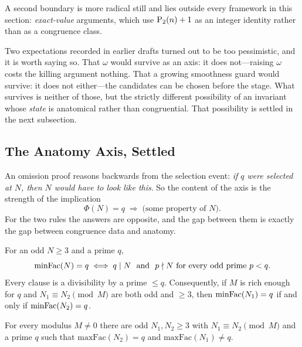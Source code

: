 \noindent
A second boundary is more radical still and lies outside every framework
in this section: \emph{exact-value} arguments, which use
$\mathrm{P}_{2}(n)+1$ as an integer identity rather than as a congruence
class.

\smallskip\noindent
Two expectations recorded in earlier drafts turned out to be too
pessimistic, and it is worth saying so.  That $\omega$ would survive as
an axis: it does not---raising $\omega$ costs the killing argument
nothing.  That a growing smoothness guard would survive: it does not
either---the candidates can be chosen before the stage.  What survives
is neither of those, but the strictly different possibility of an
invariant whose \emph{state} is anatomical rather than congruential.
That possibility is settled in the next subsection.

\subsection{The Anatomy Axis, Settled}
\label{sec:anatomy-axis}

An omission proof reasons backwards from the selection event: \emph{if
$q$ were selected at $N$, then $N$ would have to look like this}.  So the
content of the axis is the strength of the implication
\[
  \Phi(N) = q \;\Longrightarrow\; \text{(some property of } N\text{)}.
\]
For the two rules the answers are opposite, and the gap between them is
exactly the gap between congruence data and anatomy.

\begin{theorem}
\label{thm:min-congruence-determined}
For an odd $N \geq 3$ and a prime $q$,
\[
  \mathrm{minFac}(N) = q
  \iff
  q \mid N \ \text{ and } \ p \nmid N \text{ for every odd prime } p < q .
\]
Every clause is a divisibility by a prime $\leq q$.  Consequently, if $M$
is rich enough for $q$ and $N_1 \equiv N_2 \pmod M$ are both odd and
$\geq 3$, then $\mathrm{minFac}(N_1) = q$ if and only if $\mathrm{minFac}(N_2) = q$.
\end{theorem}

\begin{theorem}
\label{thm:max-not-determined}
For every modulus $M \neq 0$ there are odd $N_1, N_2 \geq 3$ with
$N_1 \equiv N_2 \pmod M$ and a prime $q$ such that
$\mathrm{maxFac}(N_2) = q$ and $\mathrm{maxFac}(N_1) \neq q$.
\end{theorem}


